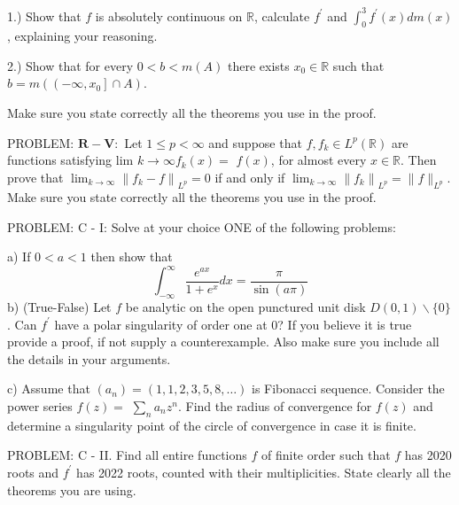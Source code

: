 \documentclass[14pt]{extarticle}
\begin{document}
1.) Show that $f$ is absolutely continuous on $\mathbb{R}$, calculate $f^{\prime}$ and $\int_{0}^{3} f^{\prime}(x) d m(x)$, explaining your reasoning.

2.) Show that for every $0<b<m(A)$ there exists $x_{0} \in \mathbb{R}$ such that $b=m\left(\left(-\infty, x_{0}\right] \cap A\right)$.

Make sure you state correctly all the theorems you use in the proof.


\newpage
PROBLEM: $\mathbf{R}-\mathbf{V}:$ Let $1 \leq p<\infty$ and suppose that $f, f_{k} \in L^{p}(\mathbb{R})$ are functions satisfying lim $k \rightarrow \infty f_{k}(x)=$ $f(x)$, for almost every $x \in \mathbb{R}$. Then prove that $\lim _{k \rightarrow \infty}\left\|f_{k}-f\right\|_{L^{p}}=0$ if and only if $\lim _{k \rightarrow \infty}\left\|f_{k}\right\|_{L^{p}}=\|f\|_{L^{p}}$. Make sure you state correctly all the theorems you use in the proof.


\newpage
PROBLEM: C - I: Solve at your choice ONE of the following problems:

a) If $0<a<1$ then show that
$$
\int_{-\infty}^{\infty} \frac{e^{a x}}{1+e^{x}} d x=\frac{\pi}{\sin (a \pi)}
$$
b) (True-False) Let $f$ be analytic on the open punctured unit disk $D(0,1) \backslash\{0\}$. Can $f^{\prime}$ have a polar singularity of order one at 0? If you believe it is true provide a proof, if not supply a counterexample. Also make sure you include all the details in your arguments.

c) Assume that $\left(a_{n}\right)=(1,1,2,3,5,8, \ldots)$ is Fibonacci sequence. Consider the power series $f(z)=$ $\sum_{n} a_{n} z^{n}$. Find the radius of convergence for $f(z)$ and determine a singularity point of the circle of convergence in case it is finite.



\newpage
PROBLEM: C - II. Find all entire functions $f$ of finite order such that $f$ has 2020 roots and $f^{\prime}$ has 2022 roots, counted with their multiplicities. State clearly all the theorems you are using.
\end{document}
